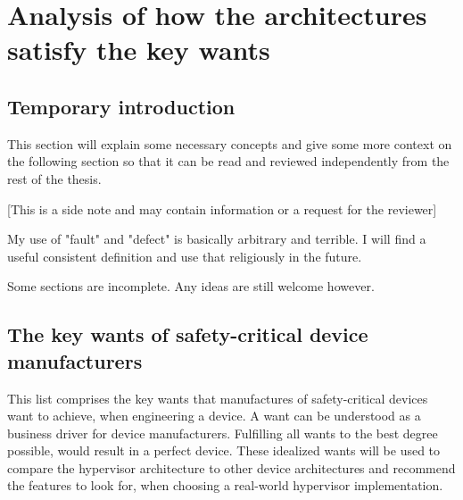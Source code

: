 
\chapter{Analysis of how the architectures satisfy the key wants} %

\label{Chapter3} %


\newcommand{\keyword}[1]{\textbf{#1}}
\newcommand{\tabhead}[1]{\textbf{#1}}
\newcommand{\code}[1]{\texttt{#1}}
\newcommand{\file}[1]{\texttt{\bfseries#1}}
\newcommand{\option}[1]{\texttt{\itshape#1}}


\section{Temporary introduction}
This section will explain some necessary concepts and give some more context on the following section so that it can be read and reviewed independently from the rest of the thesis.

[This is a side note and may contain information or a request for the reviewer]

My use of "fault" and "defect" is basically arbitrary and terrible. I will find a useful consistent definition and use that religiously in the future.

Some sections are incomplete. Any ideas are still welcome however.

\section{The key wants of safety-critical device manufacturers}
This list comprises the key wants that manufactures of safety-critical devices want to achieve, when engineering a device. A want can be understood as a business driver for device manufacturers. Fulfilling all wants to the best degree possible, would result in a perfect device. These idealized wants will be used to compare the hypervisor architecture to other device architectures and recommend the features to look for, when choosing a real-world hypervisor implementation.

